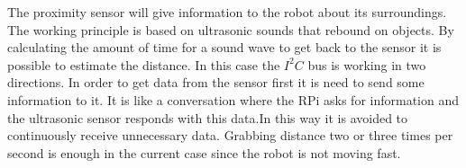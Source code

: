 The proximity sensor will give information to the robot about its surroundings. The working principle is based on ultrasonic sounds that rebound on objects. By calculating the amount of time for a sound wave to get back to the sensor it is possible to estimate the distance. In this case the $I^{2}C$ bus is working in two directions. In order to get data from the sensor first it is need to send some information to it. It is like a conversation where the RPi asks for information and the ultrasonic sensor responds with this data.In this way it is avoided to continuously receive unnecessary data. Grabbing distance two or three times per second is enough in the current case since the robot is not moving fast.
